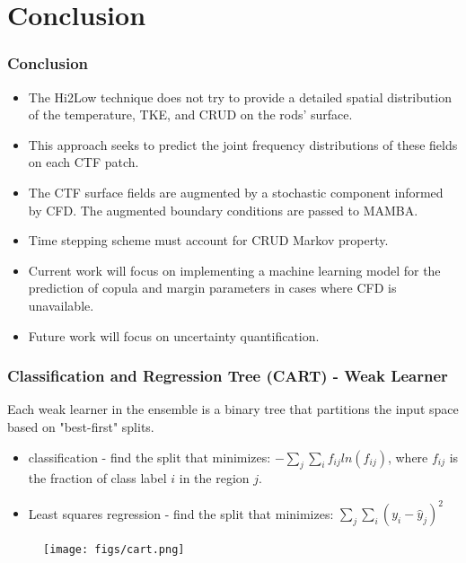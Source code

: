 \documentclass[t, pdftex]{beamer}
\makeatletter
\def\beamer@writeslidentry@miniframesoff{%
    \expandafter\beamer@ifempty\expandafter{\beamer@framestartpage}{}%
    {%
        \clearpage\beamer@notesactions%
    }
}
\newcommand*{\miniframesoff}{\let\beamer@writeslidentry=\beamer@writeslidentry@miniframesoff}
\makeatother
\begin{document}
\section{Conclusion}
\begin{frame}
\frametitle{Conclusion}
\begin{itemize}
\item The Hi2Low technique does not try to provide a detailed spatial distribution
of the temperature, TKE, and CRUD on the rods' surface.
\item This approach seeks to predict the joint frequency distributions of these fields on each CTF patch.
\item The CTF surface fields are augmented by a stochastic component informed by CFD.  The augmented boundary conditions are passed to MAMBA.
\item Time stepping scheme must account for CRUD Markov property.
\item Current work will focus on implementing a machine learning model for the prediction of copula and margin parameters in cases where CFD is unavailable.
\item Future work will focus on uncertainty quantification.
\end{itemize}
\end{frame}

\miniframesoff
\lastframe%


\begin{frame}[shrink=10, noframenumbering]
\frametitle{Classification and Regression Tree (CART) - Weak Learner}
Each weak learner in the ensemble is a binary tree that partitions the input space based on "best-first" splits.  
\begin{itemize}
\item classification - find the split that minimizes: $-\sum_j\sum_i f_{ij} ln(f_{ij})$, where $f_{ij}$ is the fraction of class label $i$ in the region $j$.
\item Least squares regression - find the split that minimizes: $\sum_j\sum_i(y_i - \hat y_{j})^2$
\end{itemize}

\begin{figure}[!htbp]
\centering
\texttt{[image: figs/cart.png]}
\label{model_overview}
\end{figure}
\end{frame}
\end{document}
